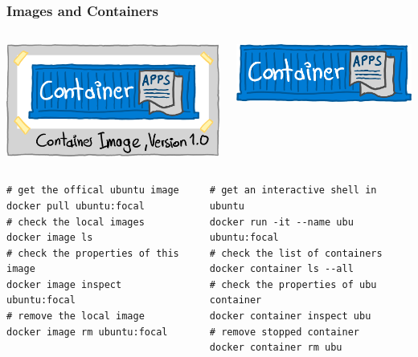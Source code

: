 \begin{frame}[fragile]
	\frametitle{Images and Containers}
	\begin{columns}
		\centering
		\includegraphics[width=.75\textwidth]{pics/container_image.png}
		
		\centering
		\includegraphics[width=.75\textwidth]{pics/container_large.png}
		
	\end{columns}
	\begin{columns}[t]
		\column{.47\textwidth}
		\begin{lstlisting}
# get the offical ubuntu image
docker pull ubuntu:focal
# check the local images
docker image ls
# check the properties of this image
docker image inspect ubuntu:focal
# remove the local image
docker image rm ubuntu:focal
		\end{lstlisting}
		
		\column{.5\textwidth}
		\begin{lstlisting}
# get an interactive shell in ubuntu
docker run -it --name ubu ubuntu:focal
# check the list of containers
docker container ls --all
# check the properties of ubu container
docker container inspect ubu
# remove stopped container
docker container rm ubu
		\end{lstlisting}
	\end{columns}
\end{frame}


